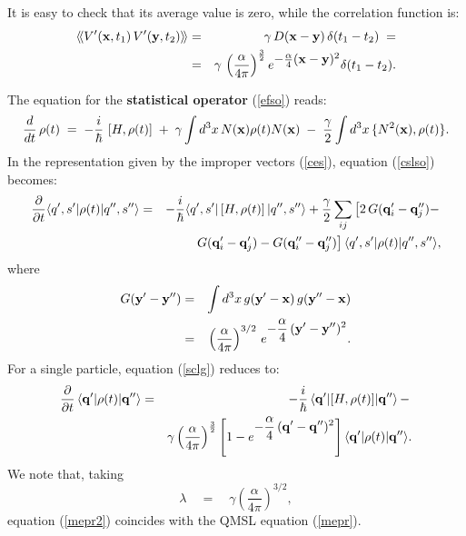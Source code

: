\documentclass[12pt]{article}
\newcommand{\llangle}{\langle\!\langle}
\newcommand{\rrangle}{\rangle\!\rangle}
\begin{document}
It is easy to check that its average value is zero, while the
correlation function is:
\begin{eqnarray} \label{fcrov}
\llangle V'({\bf x}, t_{1})\, V'({\bf y}, t_{2}) \rrangle & = &
\gamma\, D({\bf x} - {\bf y}) \, \delta(t_{1} - t_{2})
\; = \nonumber \\
& = & \gamma\, \left(\frac{\alpha}{4\pi}\right)^{\frac{3}{2}}
e^{\makebox{$-\frac{\alpha}{4}({\bf x} - {\bf y})^{2}$}}
\delta(t_{1} - t_{2}).
\end{eqnarray}

The equation  for the {\bf statistical operator} (\ref{efso})
reads:
\begin{equation} \label{cslso}
\frac{d}{dt}\, \rho(t) \; = \; - \frac{i}{\hbar}\, \left[ H,
\rho(t) \right] \; + \; \gamma \int d^3 x \, N({\bf x}) \rho(t)
N({\bf x}) \; - \; \frac{\gamma}{2}  \int d^3 x \, \{ N^{2}({\bf
x}) , \rho(t) \}.
\end{equation}
In the representation given by the improper vectors (\ref{ces}),
equation (\ref{cslso}) becomes:
\begin{eqnarray} \label{sclg}
\frac{\partial}{\partial t} \langle q', s'| \rho(t) | q'', s''
\rangle & = & - \frac{i}{\hbar} \langle q', s' | \left[ H, \rho(t)
\right]  | q'', s'' \rangle \nonumber + \frac{\gamma}{2} \sum
_{ij} \left[ 2\,
G({\bf q}_{i}' - {\bf q}_{j}'') - \right. \nonumber \\
& & \left. G({\bf q}_{i}' - {\bf q}_{j}') - G({\bf q}_{i}'' - {\bf
q}_{j}'') \right] \langle q' ,s' | \rho(t) | q'', s'' \rangle,
\end{eqnarray}
where
\begin{eqnarray}
G({\bf y}' - {\bf y}'') & = & \int d^{3} x \, g({\bf y}' - {\bf
x})\, g({\bf y}'' - {\bf x}) \nonumber \\ & = & \left(
\frac{\alpha}{4\pi} \right)^{3/2}\, e^{\displaystyle -
\frac{\alpha}{4}\, ({\bf y}' - {\bf y}'')^{2}}.
\end{eqnarray}
For a single particle, equation (\ref{sclg}) reduces to:
\begin{eqnarray} \label{mepr2}
\frac{\partial}{\partial t}\, \langle{\bf q}'|\rho(t)|{\bf
q}''\rangle & = & - \frac{i}{\hbar}\, \langle{\bf q}'|[H, \rho(t)
]|{\bf q}''\rangle \, - \, \nonumber \\ & &
\gamma\left(\frac{\alpha}{4\pi}\right)^{\frac{3}{2}} \left[ 1 -
e^{\displaystyle - \frac{\alpha}{4}\, ({\bf q}' - {\bf q}'')^{2}}
\right] \langle{\bf q}'|\rho(t)|{\bf q}''\rangle.
\end{eqnarray}
We note that, taking
\begin{equation} \label{rrde}
\lambda \quad = \quad \gamma
\left(\frac{\alpha}{4\pi}\right)^{3/2},
\end{equation}
equation (\ref{mepr2}) coincides with the QMSL equation
(\ref{mepr}).
\end{document}
